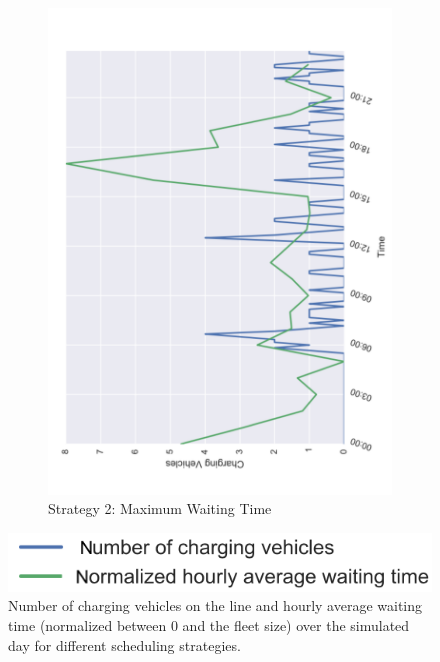 \documentclass[12pt,a4paper]{article}
\begin{document}
\begin{figure}
\begin{subfigure}[b]{0.458\textwidth}
  \includegraphics[width=\linewidth]{./images/charge2}
  \caption{Strategy 2: Maximum Waiting Time}
  \label{batterystrat2}
\end{subfigure}
\begin{center}
\vspace{-0.5em}
\includegraphics[scale=0.35]{./images/labels}
\end{center}
\caption{Number of charging vehicles on the line and hourly average waiting time (normalized between 0 and the fleet size) over the simulated day for different scheduling strategies.}
\label{sendtocharge}
\end{figure}
\end{document}
